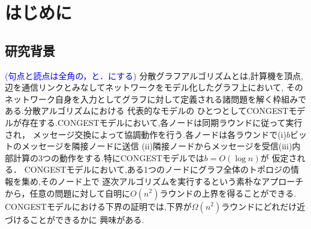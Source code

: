 \documentclass[12pt]{thesis}
\newcommand{\Izumi}[1]{\textcolor{blue}{(#1)}}
\newcommand{\CONGEST}{\textsf{CONGEST}}
\theoremstyle{definition}
\begin{document}
\baselineskip=22pt
\pagestyle{empty}

\maketitle

\pagestyle{myheadings}	%
\tableofcontents

\newpage


\chapter{はじめに}

\section{研究背景}
\Izumi{句点と読点は全角の，と．にする}
分散グラフアルゴリズムとは,計算機を頂点,辺を通信リンクとみなしてネットワークをモデル化したグラフ上において,
そのネットワーク自身を入力としてグラフに対して定義される諸問題を解く枠組みである.分散アルゴリズムにおける
代表的なモデルの
ひとつとして{{\CONGEST}}モデルが存在する.{\CONGEST}モデルにおいて,各ノードは同期ラウンドに従って実行され，
メッセージ交換によって協調動作を行う.各ノードは各ラウンドで(i)$b$ビットのメッセージを隣接ノードに送信
(ii)隣接ノードからメッセージを受信(iii)内部計算の3つの動作をする.特に{\CONGEST}モデルでは$b = O(\log n)$が
仮定される．
{\CONGEST}モデルにおいて,ある1つのノードにグラフ全体のトポロジの情報を集め,そのノード上で
逐次アルゴリズムを実行するという素朴なアプローチから，任意の問題に対して自明に$O (n^{2})$ラウンドの上界を得ることができる.
{\CONGEST}モデルにおける下界の証明では,下界が$\Omega(n^{2})$ラウンドにどれだけ近づけることができるかに
興味がある.
\end{document}
